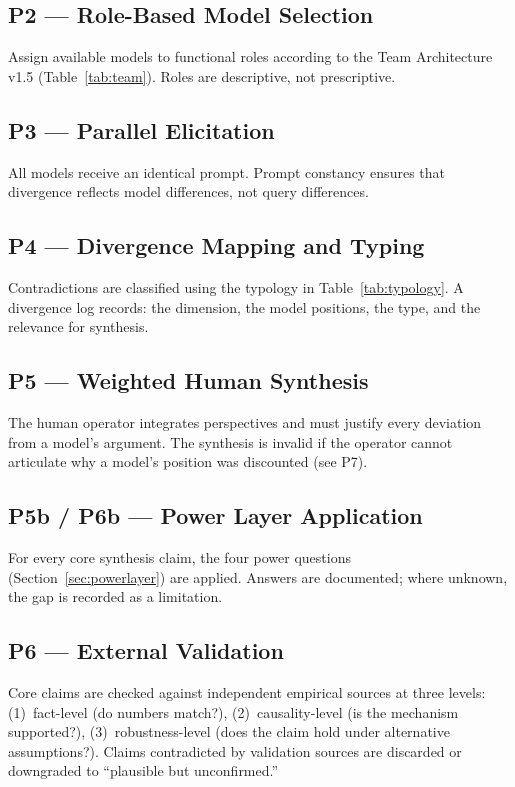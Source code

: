 \documentclass[10pt,a4paper]{article}
\begin{document}
\subsection{P2 — Role-Based Model Selection}
Assign available models to functional roles according to the Team Architecture
v1.5 (Table~\ref{tab:team}). Roles are descriptive, not prescriptive.

\subsection{P3 — Parallel Elicitation}
All models receive an identical prompt. Prompt constancy ensures that divergence
reflects model differences, not query differences.

\subsection{P4 — Divergence Mapping and Typing}
Contradictions are classified using the typology in Table~\ref{tab:typology}.
A divergence log records: the dimension, the model positions, the type, and the
relevance for synthesis.

\subsection{P5 — Weighted Human Synthesis}
The human operator integrates perspectives and must justify every deviation from
a model's argument. The synthesis is invalid if the operator cannot articulate why
a model's position was discounted (see P7).

\subsection{P5b / P6b — Power Layer Application}
For every core synthesis claim, the four power questions (Section~\ref{sec:powerlayer})
are applied. Answers are documented; where unknown, the gap is recorded as a
limitation.

\subsection{P6 — External Validation}
Core claims are checked against independent empirical sources at three levels:
(1)~fact-level (do numbers match?),
(2)~causality-level (is the mechanism supported?),
(3)~robustness-level (does the claim hold under alternative assumptions?).
Claims contradicted by validation sources are discarded or downgraded to
``plausible but unconfirmed.''
\end{document}
